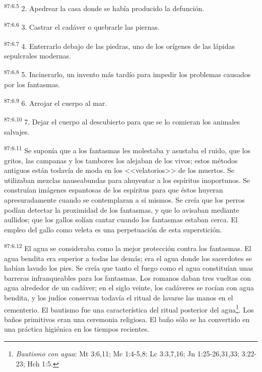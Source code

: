 \documentclass[twoside, 11pt]{book}
\begin{document}
\par
\textsuperscript{87:6.5} 2. Apedrear la casa donde se había producido la defunción.

\par
\textsuperscript{87:6.6} 3. Castrar el cadáver o quebrarle las piernas.

\par
\textsuperscript{87:6.7} 4. Enterrarlo debajo de las piedras, uno de los orígenes de las lápidas sepulcrales modernas.

\par
\textsuperscript{87:6.8} 5. Incinerarlo, un invento más tardío para impedir los problemas causados por los fantasmas.

\par
\textsuperscript{87:6.9} 6. Arrojar el cuerpo al mar.

\par
\textsuperscript{87:6.10} 7. Dejar el cuerpo al descubierto para que se lo comieran los animales salvajes.

\par
\textsuperscript{87:6.11} Se suponía que a los fantasmas les molestaba y asustaba el ruido, que los gritos, las campanas y los tambores los alejaban de los vivos; estos métodos antiguos están todavía de moda en los <<velatorios>> de los muertos. Se utilizaban mezclas nauseabundas para ahuyentar a los espíritus inoportunos. Se construían imágenes espantosas de los espíritus para que éstos huyeran apresuradamente cuando se contemplaran a sí mismos. Se creía que los perros podían detectar la proximidad de los fantasmas, y que lo avisaban mediante aullidos; que los gallos solían cantar cuando los fantasmas estaban cerca. El empleo del gallo como veleta es una perpetuación de esta superstición.

\par
\textsuperscript{87:6.12} El agua se consideraba como la mejor protección contra los fantasmas. El agua bendita era superior a todas las demás; era el agua donde los sacerdotes se habían lavado los pies. Se creía que tanto el fuego como el agua constituían unas barreras infranqueables para los fantasmas. Los romanos daban tres vueltas con agua alrededor de un cadáver; en el siglo veinte, los cadáveres se rocían con agua bendita, y los judíos conservan todavía el ritual de lavarse las manos en el cementerio. El bautismo fue una característica del ritual posterior del agua\footnote{\textit{Bautismo con agua}: Mt 3:6,11; Mc 1:4-5,8; Lc 3:3,7,16; Jn 1:25-26,31,33; 3:22-23; Hch 1:5.}. Los baños primitivos eran una ceremonia religiosa. El baño sólo se ha convertido en una práctica higiénica en los tiempos recientes.
\end{document}
